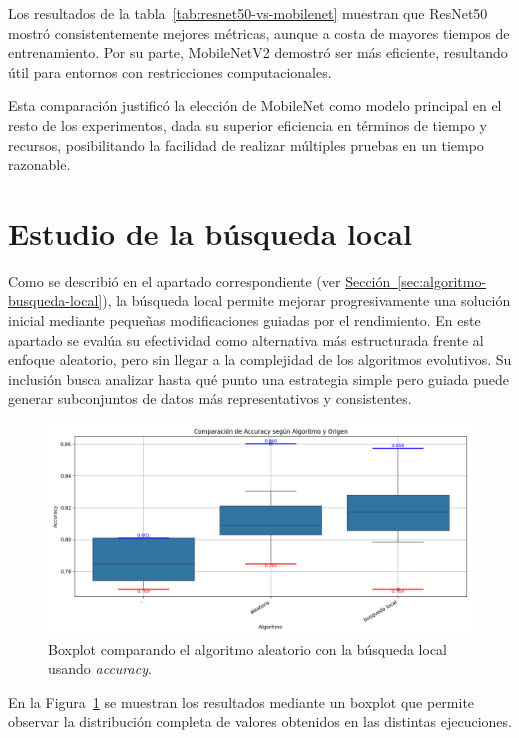 Los resultados de la tabla~\ref{tab:resnet50-vs-mobilenet} muestran que ResNet50 mostró consistentemente mejores métricas,
aunque a costa de mayores tiempos de entrenamiento.
Por su parte, MobileNetV2 demostró ser más eficiente, resultando útil para entornos con restricciones computacionales.

Esta comparación justificó la elección de MobileNet como modelo principal en el resto de los experimentos,
dada su superior eficiencia en términos de tiempo y recursos, posibilitando la facilidad de realizar múltiples pruebas en un tiempo razonable.


\section{Estudio de la búsqueda local}\label{sec:estudio-busqueda-local}
Como se describió en el apartado correspondiente (ver \hyperref[sec:algoritmo-busqueda-local]{Sección~\ref*{sec:algoritmo-busqueda-local}}),
la búsqueda local permite mejorar progresivamente una solución inicial mediante pequeñas modificaciones guiadas por el rendimiento.
En este apartado se evalúa su efectividad como alternativa más estructurada frente al enfoque aleatorio, pero sin llegar a la complejidad de los algoritmos evolutivos.
Su inclusión busca analizar hasta qué punto una estrategia simple pero guiada puede generar subconjuntos de datos más representativos y consistentes.

\begin{figure}[H]
    \centering
    \includegraphics[width=1\textwidth]{imagenes/evaluaciones/comparacion_aleatorio-bl}
    \caption{Boxplot comparando el algoritmo aleatorio con la búsqueda local usando \textit{accuracy}.}
    \label{fig:aleatorio-vs-busqueda-local}
\end{figure}

En la Figura~\ref{fig:aleatorio-vs-busqueda-local} se muestran los resultados mediante un boxplot que permite observar
la distribución completa de valores obtenidos en las distintas ejecuciones.

